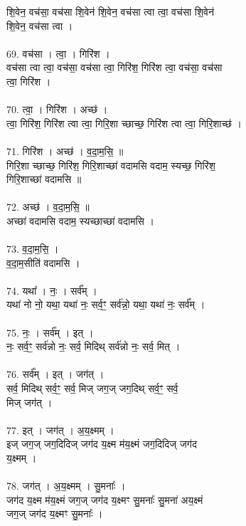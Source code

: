 शि॒वेन॒ वच॑सा॒ वच॑सा शि॒वेन॑ शि॒वेन॒ वच॑सा त्वा त्वा॒ वच॑सा शि॒वेन॑\\
शि॒वेन॒ वच॑सा त्वा ।\\
\\
69. वच॑सा । त्वा॒ । गिरि॑श ।\\
वच॑सा त्वा त्वा॒ वच॑सा॒ वच॑सा त्वा॒ गिरि॑श॒ गिरि॑श त्वा॒ वच॑सा॒ वच॑सा\\
त्वा॒ गिरि॑श ।\\
\\
70. त्वा॒ । गिरि॑श । अच्छ॑ ।\\
त्वा॒ गिरि॑श॒ गिरि॑श त्वा त्वा॒ गिरि॒शा च्छाच्छ॒ गिरि॑श त्वा त्वा॒ गिरि॒शाच्छ॑ ।\\
\\
71. गिरि॑श । अच्छ॑ । व॒दा॒म॒सि॒ ॥\\
गिरि॒शा च्छाच्छ॒ गिरि॑श॒ गिरि॒शाच्छा॑ वदामसि वदाम॒ स्यच्छ॒ गिरि॑श॒\\
गिरि॒शाच्छा॑ वदामसि ॥\\
\\
72. अच्छ॑ । व॒दा॒म॒सि॒ ॥\\
अच्छा॑ वदामसि वदाम॒ स्यच्छाच्छा॑ वदामसि ।\\
\\
73. व॒दा॒म॒सि॒ ।\\
व॒दा॒म॒सीति॑ वदामसि ।\\
\\
74. यथा᳚ । नः॒ । सर्व᳚म् ।\\
यथा॑ नो नो॒ यथा॒ यथा॑ नः॒ सर्व॒ꣳ॒ सर्व॑न्नो॒ यथा॒ यथा॑ नः॒ सर्व᳚म् ।\\
\\
75. नः॒ । सर्व᳚म् । इत् ।\\
नः॒ सर्व॒ꣳ॒ सर्व॑न्नो नः॒ सर्व॒ मिदिथ् सर्व॑न्नो नः॒ सर्व॒ मित् ।\\
\\
76. सर्व᳚म् । इत् । जग॑त् ।\\
सर्व॒ मिदिथ् सर्व॒ꣳ॒ सर्व॒ मिज् जग॒ज् जग॒दिथ् सर्व॒ꣳ॒ सर्व॒\\
मिज् जग॑त् ।\\
\\
77. इत् । जग॑त् । अ॒य॒क्ष्मम् ।\\
इज् जग॒ज् जग॒दिदिज् जग॑द य॒क्ष्म म॑य॒क्ष्मं जग॒दिदिज् जग॑द\\
य॒क्ष्मम् ।\\
\\
78. जग॑त् । अ॒य॒क्ष्मम् । सु॒मनाः᳚ ।\\
जग॑द य॒क्ष्म म॑य॒क्ष्मं जग॒ज् जग॑द य॒क्ष्मꣳ सु॒मनाः᳚ सु॒मना॑ अय॒क्ष्मं\\
जग॒ज् जग॑द य॒क्ष्मꣳ सु॒मनाः᳚ ।\\

